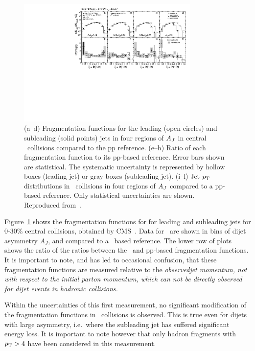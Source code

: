 \begin{figure}[!ht]
\begin{center}
\includegraphics[width=0.8\textwidth]{jetfigures/xsi_div_both_effv9_l100s40_0to12_dphi20eta20dr3pt4id1_cwt_ppDiv_gray.pdf}
\caption{(a--d) Fragmentation functions for the leading (open circles) and subleading (solid points) 
jets in four regions of $A_J$ in central \PbPb\ collisions compared to the pp reference.
(e--h) Ratio of each fragmentation function to its pp-based reference.
Error bars shown are statistical. The systematic uncertainty is
represented by hollow boxes (leading jet) or gray boxes (subleading jet).
(i--l) Jet $\mbox{$p_{\mathrm{T}}$}$ distributions in \PbPb\ collisions in four regions of $A_J$
compared to a pp-based reference. Only statistical uncertainties are shown.
Reproduced from~\cite{Chatrchyan:2012gw}.
}

\label{fig:GR:CMS_jetFF}
\end{center}
\end{figure}
Figure~\ref{fig:GR:CMS_jetFF} shows the fragmentation functions for
for leading and subleading jets for 0-30\% central collisions, obtained
by CMS~\cite{Chatrchyan:2012gw}. Data for \PbPb\ are shown in 
bins of dijet asymmetry $A_J$, and compared to a \pp\ based reference.
The lower row of plots shows the ratio of the ratios between the \PbPb\
and pp-based fragmentation functions. It is important to note, and has 
led to occasional confusion, that these fragmentation functions are 
measured relative to the \em observed\em jet momentum, not with respect
to the initial parton momentum, which can not be directly observed
for dijet events in hadronic collisions.

Within the uncertainties of this first measurement, no significant modification of
the fragmentation functions in \PbPb\ collisions is observed. This is true even for
dijets with large asymmetry, i.e.\ where the subleading jet has suffered significant
energy loss. It is important to note however that only hadron fragments with $\mbox{$p_{\mathrm{T}}$} > 4$\GeVc
have been considered in this measurement.

